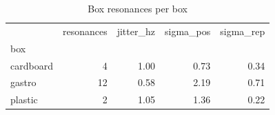 \begin{table}
\caption{Box resonances per box}
\label{tab:box_resonances_summary}
\begin{tabular}{lrrrr}
\toprule
 & resonances & jitter\_hz & sigma\_pos & sigma\_rep \\
box &  &  &  &  \\
\midrule
cardboard & 4 & 1.00 & 0.73 & 0.34 \\
gastro & 12 & 0.58 & 2.19 & 0.71 \\
plastic & 2 & 1.05 & 1.36 & 0.22 \\
\bottomrule
\end{tabular}
\end{table}
